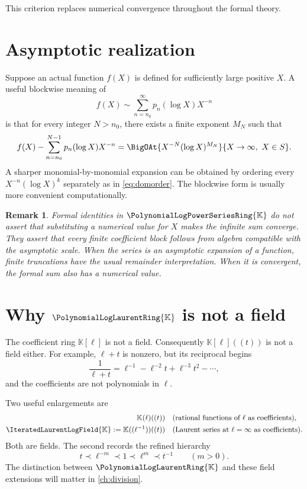 \documentclass[11pt,oneside,openany]{book}
\newtheorem{remark}[theorem]{Remark}
\newcommand{\K}{\mathbb{K}}
\newcommand{\Rring}{\PolynomialLogPowerSeriesRing{\K}}
\newcommand{\Pring}{\PolynomialLogLaurentRing{\K}}
\newcommand{\Fring}{\IteratedLaurentLogField{\K}}
\begin{document}
This criterion replaces numerical convergence throughout the formal theory.

\section{Asymptotic realization}
Suppose an actual function \(f(X)\) is defined for sufficiently large positive
\(X\).  A useful blockwise meaning of
\[
  f(X)\sim\sum_{n=n_0}^{\infty}p_n(\log X)X^{-n}
\]
is that for every integer \(N>n_0\), there exists a finite exponent \(M_N\)
such that
\begin{equation}\label{eq:blockasymp}
  f(X)-\sum_{n=n_0}^{N-1}p_n(\log X)X^{-n}
  =\BigOAt{X^{-N}(\log X)^{M_N}}{X\to\infty,\ X\in S}.
\end{equation}
A sharper monomial-by-monomial expansion can be obtained by ordering every
\(X^{-n}(\log X)^k\) separately as in \cref{eq:domorder}.  The blockwise form is
usually more convenient computationally.

\begin{remark}
Formal identities in \(\Rring\) do not assert that substituting a numerical
value for \(X\) makes the infinite sum converge.  They assert that every finite
coefficient block follows from algebra compatible with the asymptotic scale.
When the series is an asymptotic expansion of a function, finite truncations
have the usual remainder interpretation.  When it is convergent, the formal
sum also has a numerical value.
\end{remark}

\section{Why \texorpdfstring{\(\Pring\)}{P} is not a field}
The coefficient ring \(\K[\ell]\) is not a field.  Consequently
\(\K[\ell]((t))\) is not a field either.  For example, \(\ell+t\) is nonzero,
but its reciprocal begins
\begin{equation}\label{eq:elltrecip}
  \frac{1}{\ell+t}
  =\ell^{-1}-\ell^{-2}t+\ell^{-3}t^2-\cdots,
\end{equation}
and the coefficients are not polynomials in \(\ell\).

Two useful enlargements are
\begin{align}
  \K(\ell)((t))
  &\quad\text{(rational functions of \(\ell\) as coefficients)},
  \label{eq:rationalfield}\\
  \Fring:=\K((\ell^{-1}))((t))
  &\quad\text{(Laurent series at \(\ell=\infty\) as coefficients)}.
  \label{eq:iteratedfield}
\end{align}
Both are fields.  The second records the refined hierarchy
\[
  t\prec \ell^{-m}\prec1\prec\ell^m\prec t^{-1}
  \qquad(m>0).
\]
The distinction between \(\Pring\) and these field extensions will matter in
\cref{ch:division}.
\end{document}
